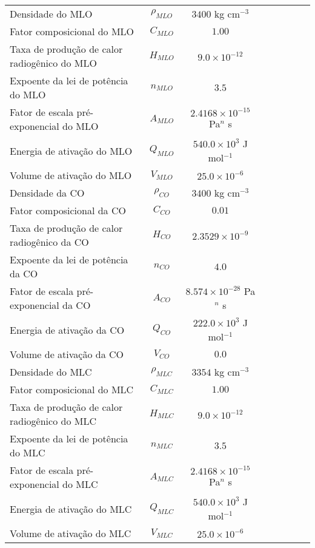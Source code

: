\begin{center}
\begin{longtable}{lccccccc}
        Densidade do MLO & $\rho_{MLO}$ & $3400$ kg cm$^{-3}$ \\
        Fator composicional do MLO & $C_{MLO}$ & $1.00$ \\
        Taxa de produção de calor radiogênico do MLO & $H_{MLO}$ & $9.0\times10^{-12}$ \\
        Expoente da lei de potência do MLO & $n_{MLO}$ & $3.5$ \\
        Fator de escala pré-exponencial do MLO & $A_{MLO}$ & $2.4168\times10^{-15}$ Pa$^{n}$ s \\
        Energia de ativação do MLO & $Q_{MLO}$ & $540.0\times10^{3}$ J mol$^{-1}$ \\
        Volume de ativação do MLO & $V_{MLO}$ & $25.0\times10^{-6}$ \\

        Densidade da CO & $\rho_{CO}$ & $3400$ kg cm$^{-3}$ \\
        Fator composicional da CO & $C_{CO}$ & $0.01$ \\
        Taxa de produção de calor radiogênico da CO & $H_{CO}$ & $2.3529\times10^{-9}$ \\
        Expoente da lei de potência da CO & $n_{CO}$ & $4.0$ \\
        Fator de escala pré-exponencial da CO & $A_{CO}$ & $8.574\times10^{-28}$ Pa$^{n}$ s \\
        Energia de ativação da CO & $Q_{CO}$ & $222.0\times10^{3}$ J mol$^{-1}$ \\
        Volume de ativação da CO & $V_{CO}$ & $0.0$ \\

        Densidade do MLC & $\rho_{MLC}$ & $3354$ kg cm$^{-3}$ \\
        Fator composicional do MLC & $C_{MLC}$ & $1.00$ \\
        Taxa de produção de calor radiogênico do MLC & $H_{MLC}$ & $9.0\times10^{-12}$ \\
        Expoente da lei de potência do MLC & $n_{MLC}$ & $3.5$ \\
        Fator de escala pré-exponencial do MLC & $A_{MLC}$ & $2.4168\times10^{-15}$ Pa$^{n}$ s \\
        Energia de ativação do MLC & $Q_{MLC}$ & $540.0\times10^{3}$ J mol$^{-1}$ \\
        Volume de ativação do MLC & $V_{MLC}$ & $25.0\times10^{-6}$ \\


\end{longtable}
\end{center}
